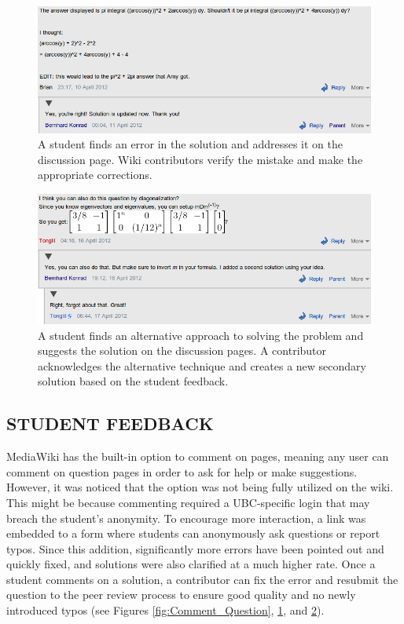 \documentclass{primus}
\begin{document}
\begin{figure}[H]
\centering
\includegraphics[width=\textwidth]{figs/Comment_Error.png}
\caption{A student finds an error in the solution and addresses it on the discussion page. Wiki contributors verify the mistake and make the appropriate corrections.}\label{fig:Comment_Error}
\end{figure}
\begin{figure}[H]
\centering
\includegraphics[width=\textwidth]{figs/Comment_Suggestion.png}
\caption{A student finds an alternative approach to solving the problem and suggests the solution on the discussion pages. A contributor acknowledges the alternative technique and creates a new secondary solution based on the student feedback.}\label{fig:Comment_Suggestion}
\end{figure}

\subsection{STUDENT FEEDBACK}\label{sec:Student_Feedback}
MediaWiki has the built-in option to comment on pages, meaning any user can comment on question pages in order to ask for help or make suggestions. However, it was noticed that the option was not being fully utilized on the wiki. This might be because commenting required a UBC-specific login that may breach the student's anonymity. To encourage more interaction, a link was embedded to a form where students can anonymously ask questions or report typos. Since this addition, significantly more errors have been pointed out and quickly fixed, and solutions were also clarified at a much higher rate. Once a student comments on a solution, a contributor can fix the error and resubmit the question to the peer review process to ensure good quality and no newly introduced typos (see Figures \ref{fig:Comment_Question}, \ref{fig:Comment_Error}, and \ref{fig:Comment_Suggestion}).
\end{document}
